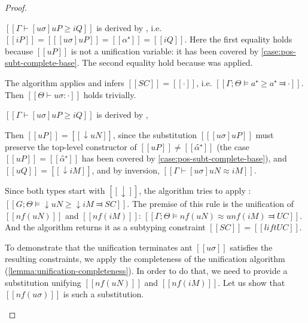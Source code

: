 \begin{proof}
\begin{caseof}
        \item \label{case:pos-subt-complete-pvar}
        $[[ Γ ⊢ [uσ]uP ≥ iQ ]]$ is derived by , 
        i.e. $[[iP]] = [[ [uσ]uP ]] = [[ α⁺ ]] = [[iQ]]$.
        Here the first equality holds because $[[uP]]$ is not a unification variable:
        it has been covered by \cref{case:pos-subt-complete-base}.
        The second equality hold because  was applied.

        The algorithm applies  and 
        infers $[[SC]] = [[·]]$, i.e. $[[Γ;Θ ⊨ a⁺ ≥ a⁺ ⫤ ·]]$.
        Then $[[Θ ⊢ uσ : ·]]$ holds trivially.


        \item \label{case:pos-subt-complete-upshift} $[[ Γ ⊢ [uσ]uP ≥ iQ ]]$ 
        is derived by ,
        
        Then $[[ uP ]] = [[ ↓uN ]]$, since the substitution $[[ [uσ]uP ]]$ must preserve the 
        top-level constructor of $[[uP]]\neq [[α̂⁺]]$ (the case $[[uP]] = [[α̂⁺]]$ has been covered
        by \cref{case:pos-subt-complete-base}), and $[[uQ]] = [[ ↓iM ]]$,
        and by inversion, $[[ Γ ⊢ [uσ]uN ≈ iM ]]$.

        Since both types start with $[[↓]]$, 
        the algorithm tries to apply : 
        $[[G;Θ ⊨ ↓uN ≥ ↓iM ⫤ SC]]$. The premise of this rule is the
        unification of $[[nf(uN)]]$ and $[[nf(iM)]]$:
        $[[Γ;Θ ⊨ nf(uN) ≈u nf(iM) ⫤ UC]]$. And the algorithm 
        returns it as a subtyping constraint $[[SC]] = [[lift UC]]$.


        To demonstrate that the unification terminates
        ant $[[uσ]]$ satisfies the resulting constraints, 
        we apply the completeness 
        of the unification algorithm (\cref{lemma:unification-completeness}). 
        In order to do that, we need to provide a substitution unifying  
        $[[nf(uN)]]$ and $[[nf(iM)]]$. 
        Let us show that $[[nf(uσ)]]$ is such a substitution. 


\end{caseof}
\end{proof}
